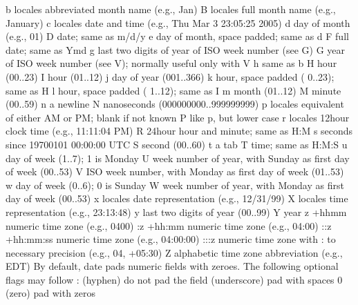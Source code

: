 \documentclass[letterpaper,12pt,english]{sphinxmanual}
\begin{document}
\begin{sphinxVerbatim}[commandchars=\\\{\}]
  \PYGZpc{}b   locale\PYGZsq{}s abbreviated month name (e.g., Jan)
  \PYGZpc{}B   locale\PYGZsq{}s full month name (e.g., January)
  \PYGZpc{}c   locale\PYGZsq{}s date and time (e.g., Thu Mar  3 23:05:25 2005)
  \PYGZpc{}d   day of month (e.g., 01)
  \PYGZpc{}D   date; same as \PYGZpc{}m/\PYGZpc{}d/\PYGZpc{}y
  \PYGZpc{}e   day of month, space padded; same as \PYGZpc{}\PYGZus{}d
  \PYGZpc{}F   full date; same as \PYGZpc{}Y\PYGZhy{}\PYGZpc{}m\PYGZhy{}\PYGZpc{}d
  \PYGZpc{}g   last two digits of year of ISO week number (see \PYGZpc{}G)
  \PYGZpc{}G   year of ISO week number (see \PYGZpc{}V); normally useful only with \PYGZpc{}V
  \PYGZpc{}h   same as \PYGZpc{}b
  \PYGZpc{}H   hour (00..23)
  \PYGZpc{}I   hour (01..12)
  \PYGZpc{}j   day of year (001..366)
  \PYGZpc{}k   hour, space padded ( 0..23); same as \PYGZpc{}\PYGZus{}H
  \PYGZpc{}l   hour, space padded ( 1..12); same as \PYGZpc{}\PYGZus{}I
  \PYGZpc{}m   month (01..12)
  \PYGZpc{}M   minute (00..59)
  \PYGZpc{}n   a newline
  \PYGZpc{}N   nanoseconds (000000000..999999999)
  \PYGZpc{}p   locale\PYGZsq{}s equivalent of either AM or PM; blank if not known
  \PYGZpc{}P   like \PYGZpc{}p, but lower case
  \PYGZpc{}r   locale\PYGZsq{}s 12\PYGZhy{}hour clock time (e.g., 11:11:04 PM)
  \PYGZpc{}R   24\PYGZhy{}hour hour and minute; same as \PYGZpc{}H:\PYGZpc{}M
  \PYGZpc{}s   seconds since 1970\PYGZhy{}01\PYGZhy{}01 00:00:00 UTC
  \PYGZpc{}S   second (00..60)
  \PYGZpc{}t   a tab
  \PYGZpc{}T   time; same as \PYGZpc{}H:\PYGZpc{}M:\PYGZpc{}S
  \PYGZpc{}u   day of week (1..7); 1 is Monday
  \PYGZpc{}U   week number of year, with Sunday as first day of week (00..53)
  \PYGZpc{}V   ISO week number, with Monday as first day of week (01..53)
  \PYGZpc{}w   day of week (0..6); 0 is Sunday
  \PYGZpc{}W   week number of year, with Monday as first day of week (00..53)
  \PYGZpc{}x   locale\PYGZsq{}s date representation (e.g., 12/31/99)
  \PYGZpc{}X   locale\PYGZsq{}s time representation (e.g., 23:13:48)
  \PYGZpc{}y   last two digits of year (00..99)
  \PYGZpc{}Y   year
  \PYGZpc{}z   +hhmm numeric time zone (e.g., \PYGZhy{}0400)
  \PYGZpc{}:z  +hh:mm numeric time zone (e.g., \PYGZhy{}04:00)
  \PYGZpc{}::z  +hh:mm:ss numeric time zone (e.g., \PYGZhy{}04:00:00)
  \PYGZpc{}:::z  numeric time zone with : to necessary precision (e.g., \PYGZhy{}04, +05:30)
  \PYGZpc{}Z   alphabetic time zone abbreviation (e.g., EDT)
By default, date pads numeric fields with zeroes.
The following optional flags may follow \PYGZsq{}\PYGZpc{}\PYGZsq{}:
  \PYGZhy{}  (hyphen) do not pad the field
  \PYGZus{}  (underscore) pad with spaces
  0  (zero) pad with zeros

\end{sphinxVerbatim}
\end{document}
